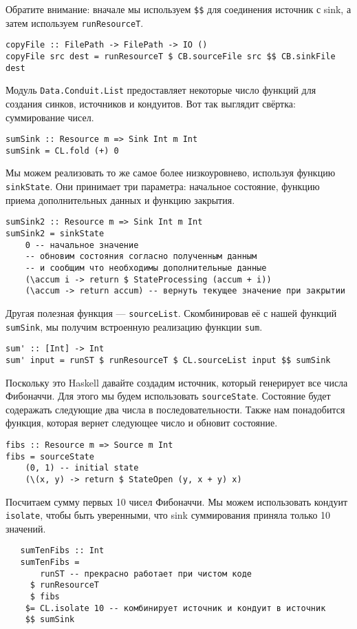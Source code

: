 Обратите внимание: вначале мы используем \verb=$$= для соединения источник с sink, а
затем используем \lstinline=runResourceT=.
\begin{lstlisting}
copyFile :: FilePath -> FilePath -> IO ()
copyFile src dest = runResourceT $ CB.sourceFile src $$ CB.sinkFile dest
\end{lstlisting}
Модуль \lstinline=Data.Conduit.List= предоставляет некоторые число функций для создания
синков, источников и кондуитов. Вот так выглядит свёртка: суммирование чисел.
\begin{lstlisting}
sumSink :: Resource m => Sink Int m Int
sumSink = CL.fold (+) 0
\end{lstlisting}
Мы можем реализовать то же самое более низкоуровнево, используя функцию \verb=sinkState=.
Они принимает три параметра: начальное состояние, функцию приема дополнительных данных и
функцию закрытия.
\begin{lstlisting}
sumSink2 :: Resource m => Sink Int m Int
sumSink2 = sinkState
    0 -- начальное значение
    -- обновим состояния согласно полученным данным 
    -- и сообщим что необходимы дополнительные данные
    (\accum i -> return $ StateProcessing (accum + i))
    (\accum -> return accum) -- вернуть текущее значение при закрытии
\end{lstlisting}
Другая полезная функция --- \verb=sourceList=. Скомбинировав её с нашей функций
\verb=sumSink=, мы получим встроенную реализацию функции \lstinline=sum=.
\begin{lstlisting}
sum' :: [Int] -> Int
sum' input = runST $ runResourceT $ CL.sourceList input $$ sumSink
\end{lstlisting}
Поскольку это Haskell давайте создадим источник, который генерирует все числа Фибоначчи.
Для этого мы будем использовать \lstinline=sourceState=. Состояние будет содеражать
следующие два
числа в последовательности. Также нам понадобится функция, которая вернет следующее число
и обновит состояние.
\begin{lstlisting}
fibs :: Resource m => Source m Int
fibs = sourceState
    (0, 1) -- initial state
    (\(x, y) -> return $ StateOpen (y, x + y) x)
\end{lstlisting}
Посчитаем сумму первых 10 чисел Фибоначчи. Мы можем использовать кондуит \lstinline=isolate=,
чтобы быть уверенными, что sink суммирования приняла только 10 значений.
\begin{lstlisting}
   sumTenFibs :: Int
   sumTenFibs =
       runST -- прекрасно работает при чистом коде
     $ runResourceT
     $ fibs
    $= CL.isolate 10 -- комбинирует источник и кондуит в источник
    $$ sumSink
\end{lstlisting}

